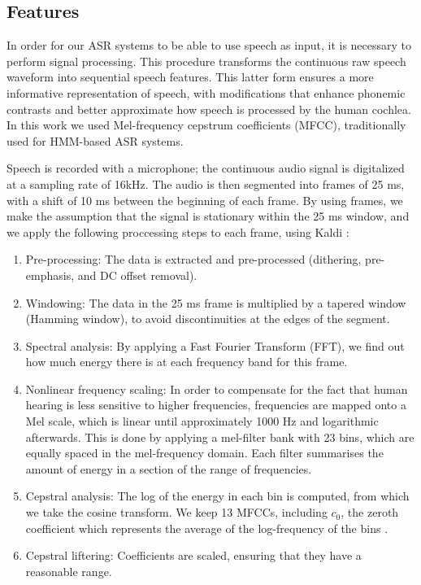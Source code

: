 \subsection{Features}
In order for our ASR systems to be able to use speech as input, it is necessary to perform signal processing. This procedure transforms the continuous raw speech waveform into sequential speech features. This latter form ensures a more informative representation of speech, with modifications that enhance phonemic contrasts and better approximate how speech is processed by the human cochlea. In this work we used Mel-frequency cepstrum coefficients (MFCC), traditionally used for HMM-based ASR systems.

Speech is recorded with a microphone; the continuous audio signal is digitalized at a sampling rate of 16kHz.
The audio is then segmented into frames of 25 ms, with a shift of 10 ms between the beginning of each frame. By using frames, we make the assumption that the signal is stationary within the 25 ms window, and we apply the following proccessing steps to each frame, using Kaldi \cite{povey2011}:

\begin{enumerate}
\item Pre-processing: The data is extracted and pre-processed (dithering, pre-emphasis, and DC offset removal).
\item Windowing: The data in the 25 ms frame is multiplied by a tapered window (Hamming window), to avoid discontinuities at the edges of the segment.
\item Spectral analysis: By applying a Fast Fourier Transform (FFT), we find out how much energy there is at each frequency band for this frame.
\item Nonlinear frequency scaling: In order to compensate for the fact that human hearing is less sensitive to higher frequencies, frequencies are mapped onto a Mel scale, which is linear until approximately 1000 Hz and logarithmic afterwards. This is done by applying a mel-filter bank with 23 bins, which are equally spaced in the mel-frequency domain. Each filter summarises the amount of energy in a section of the range of frequencies. %
\item Cepstral analysis: The log of the energy in each bin is computed, from which we take the cosine transform. We keep 13 MFCCs, including $c_{0}$, the zeroth coefficient which represents the average of the log-frequency of the bins \cite{gales2008}.
  \item Cepstral liftering: Coefficients are scaled, ensuring that they have a reasonable range.
\end{enumerate}

